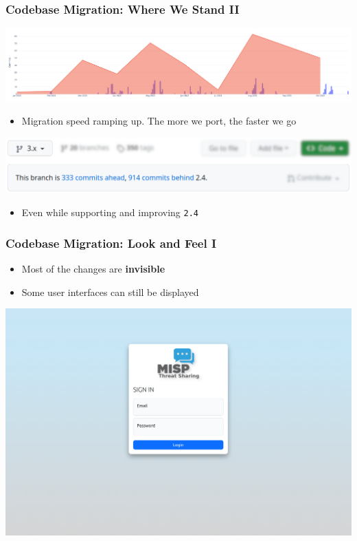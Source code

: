 \begin{frame}
    \frametitle{Codebase Migration: Where We Stand II}
    \begin{center}
        \includegraphics[width=1\linewidth]{pictures/ramping-up.png}
    \end{center}
    \begin{itemize}
        \item Migration speed ramping up. The more we port, the faster we go
    \end{itemize}
    \begin{center}
        \includegraphics[width=1\linewidth]{pictures/catering-to-2.4.png}
    \end{center}
    \begin{itemize}
        \item Even while supporting and improving \texttt{2.4}
    \end{itemize}
\end{frame}

\begin{frame}
    \frametitle{Codebase Migration: Look and Feel I}
    \begin{itemize}
        \item Most of the changes are \textbf{invisible}
        \item Some user interfaces can still be displayed
    \end{itemize}
    \begin{center}
        \includegraphics[width=0.8\linewidth]{pictures/login-screen.png}
    \end{center}
\end{frame}

